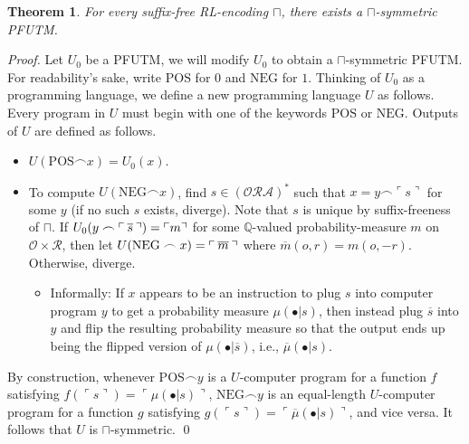 \documentclass[runningheads]{llncs}
\newtheorem{mytheorem}{Theorem}
\begin{document}
\begin{mytheorem}
\label{envirosymmetricexistencelemma}
    For every suffix-free RL-encoding $\sqcap$,
    there exists a $\sqcap$-symmetric PFUTM.
\end{mytheorem}

\begin{proof}
    Let $U_0$ be a PFUTM, we will modify $U_0$ to obtain a $\sqcap$-symmetric PFUTM.
    For readability's sake, write $\mathrm{POS}$ for $0$ and $\mathrm{NEG}$ for $1$.
    Thinking of $U_0$ as a programming language, we define a new programming language
    $U$ as follows. Every program in $U$ must begin with one of the keywords
    $\mathrm{POS}$ or $\mathrm{NEG}$. Outputs of $U$ are defined as follows.
    \begin{itemize}
        \item $U(\mathrm{POS}\frown x)=U_0(x)$.
        \item To compute $U(\mathrm{NEG}\frown x)$, find
        $s\in (\mathcal O \mathcal R\mathcal A)^*$ such that
        $x=y\frown \ulcorner s\urcorner$ for some $y$ (if no such $s$ exists, diverge).
        Note that $s$ is unique by suffix-freeness of $\sqcap$.
        If $
            U_0(y\frown
            \ulcorner \hspace{.2em} \overline s\hspace{.2em}\urcorner)
            =\ulcorner m\urcorner
        $
        for some $\mathbb Q$-valued probability-measure $m$ on
        $\mathcal O\times\mathcal R$, then let
        $U(\mathrm{NEG}\frown x)=\ulcorner\hspace{.2em} \overline m\hspace{.2em}\urcorner$
        where $\overline m(o,r)=m(o,-r)$.
        Otherwise, diverge.
        \begin{itemize}
            \item Informally:
            If $x$ appears to be an instruction to plug $s$ into computer
            program $y$ to get a probability measure $\mu(\bullet|s)$, then
            instead plug $\overline s$ into $y$ and flip the resulting
            probability measure so that the output
            ends up being the flipped version of $\mu(\bullet|\overline s)$,
            i.e., $\overline \mu(\bullet|s)$.
        \end{itemize}
    \end{itemize}
    By construction, whenever $\mathrm{POS}\frown y$ is a $U$-computer program
    for a function $f$ satisfying
    $f(\ulcorner s\urcorner)=\ulcorner \mu(\bullet|s)\urcorner$,
    $\mathrm{NEG}\frown y$ is an equal-length $U$-computer program
    for a function $g$ satisfying
    $g(\ulcorner s\urcorner)=\ulcorner \overline\mu(\bullet|s)\urcorner$,
    and vice versa.
    It follows that $U$ is $\sqcap$-symmetric.
    \qed
\end{proof}
\end{document}

